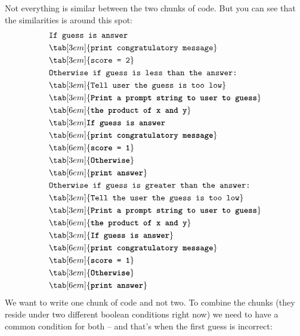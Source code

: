 Not everything is similar between the two chunks of code. But you can
see that the similarities is around this spot:\\
\begin{align*}
&\texttt{If guess is answer}\\
&\tab[3em]{\texttt{print congratulatory message}}\\
&\tab[3em]{\texttt{score = 2}}\\
&\texttt{Otherwise if guess is less than the answer:}\\
&\tab[3em]{\texttt{Tell user the guess is too low}}\\
&\tab[3em]{\texttt{\textbf{Print a prompt string to user to guess}}}\\
&\tab[6em]{\texttt{\textbf{the product of x and y}}}\\
&\tab[3em]\texttt{\textbf{If guess is answer}}\\
&\tab[6em]{\texttt{\textbf{print congratulatory message}}}\\
&\tab[6em]{\texttt{\textbf{score = 1}}}\\
&\tab[3em]{\texttt{\textbf{Otherwise}}}\\
&\tab[6em]{\texttt{\textbf{print answer}}}\\
&\texttt{Otherwise if guess is greater than the answer:}\\
&\tab[3em]{\texttt{Tell the user the guess is too low}}\\
&\tab[3em]{\texttt{\textbf{Print a prompt string to user to guess}}}\\
&\tab[6em]{\texttt{\textbf{the product of x and y}}}\\
&\tab[3em]{\texttt{\textbf{If guess is answer}}}\\
&\tab[6em]{\texttt{\textbf{print congratulatory message}}}\\
&\tab[6em]{\texttt{\textbf{score = 1}}}\\
&\tab[3em]{\texttt{\textbf{Otherwise}}}\\
&\tab[6em]{\texttt{\textbf{print answer}}}\\
\end{align*}
We want to write one chunk of code and not two. To combine the chunks
(they reside under two different boolean conditions right now) we need
to have a common condition for both -- and that's when
the first guess is incorrect:
